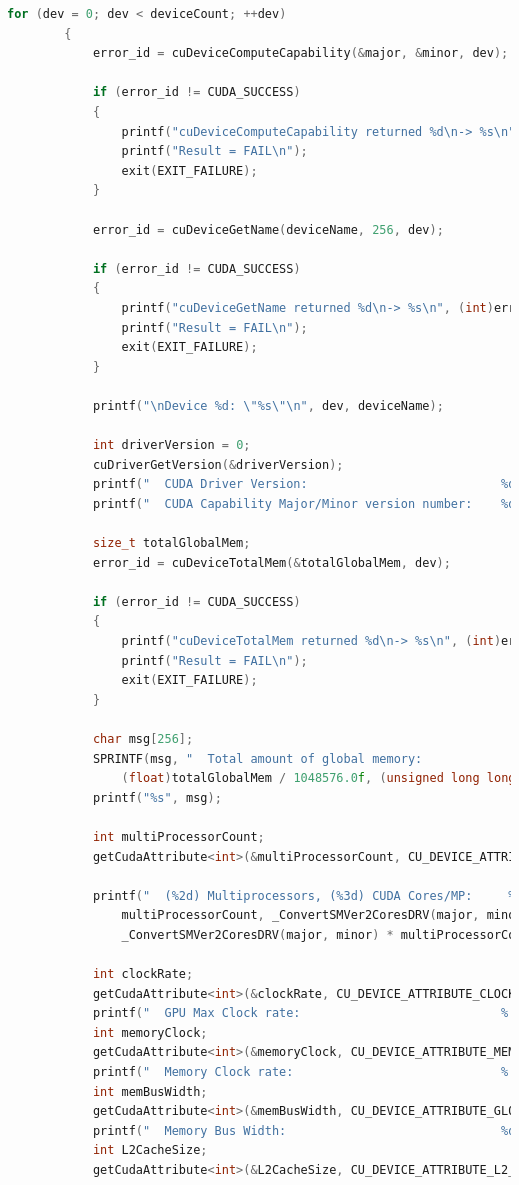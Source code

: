 \documentclass{scrreprt}
\begin{document}
\begin{lstlisting}[language=C++, caption=deviceQueryDrv.h]
		for (dev = 0; dev < deviceCount; ++dev)
		{
			error_id = cuDeviceComputeCapability(&major, &minor, dev);

			if (error_id != CUDA_SUCCESS)
			{
				printf("cuDeviceComputeCapability returned %d\n-> %s\n", (int)error_id, getCudaDrvErrorString(error_id));
				printf("Result = FAIL\n");
				exit(EXIT_FAILURE);
			}

			error_id = cuDeviceGetName(deviceName, 256, dev);

			if (error_id != CUDA_SUCCESS)
			{
				printf("cuDeviceGetName returned %d\n-> %s\n", (int)error_id, getCudaDrvErrorString(error_id));
				printf("Result = FAIL\n");
				exit(EXIT_FAILURE);
			}

			printf("\nDevice %d: \"%s\"\n", dev, deviceName);

			int driverVersion = 0;
			cuDriverGetVersion(&driverVersion);
			printf("  CUDA Driver Version:                           %d.%d\n", driverVersion / 1000, (driverVersion % 100) / 10);
			printf("  CUDA Capability Major/Minor version number:    %d.%d\n", major, minor);

			size_t totalGlobalMem;
			error_id = cuDeviceTotalMem(&totalGlobalMem, dev);

			if (error_id != CUDA_SUCCESS)
			{
				printf("cuDeviceTotalMem returned %d\n-> %s\n", (int)error_id, getCudaDrvErrorString(error_id));
				printf("Result = FAIL\n");
				exit(EXIT_FAILURE);
			}

			char msg[256];
			SPRINTF(msg, "  Total amount of global memory:                 %.0f MBytes (%llu bytes)\n",
				(float)totalGlobalMem / 1048576.0f, (unsigned long long) totalGlobalMem);
			printf("%s", msg);

			int multiProcessorCount;
			getCudaAttribute<int>(&multiProcessorCount, CU_DEVICE_ATTRIBUTE_MULTIPROCESSOR_COUNT, dev);

			printf("  (%2d) Multiprocessors, (%3d) CUDA Cores/MP:     %d CUDA Cores\n",
				multiProcessorCount, _ConvertSMVer2CoresDRV(major, minor),
				_ConvertSMVer2CoresDRV(major, minor) * multiProcessorCount);

			int clockRate;
			getCudaAttribute<int>(&clockRate, CU_DEVICE_ATTRIBUTE_CLOCK_RATE, dev);
			printf("  GPU Max Clock rate:                            %.0f MHz (%0.2f GHz)\n", clockRate * 1e-3f, clockRate * 1e-6f);
			int memoryClock;
			getCudaAttribute<int>(&memoryClock, CU_DEVICE_ATTRIBUTE_MEMORY_CLOCK_RATE, dev);
			printf("  Memory Clock rate:                             %.0f Mhz\n", memoryClock * 1e-3f);
			int memBusWidth;
			getCudaAttribute<int>(&memBusWidth, CU_DEVICE_ATTRIBUTE_GLOBAL_MEMORY_BUS_WIDTH, dev);
			printf("  Memory Bus Width:                              %d-bit\n", memBusWidth);
			int L2CacheSize;
			getCudaAttribute<int>(&L2CacheSize, CU_DEVICE_ATTRIBUTE_L2_CACHE_SIZE, dev);


\end{lstlisting}
\end{document}
